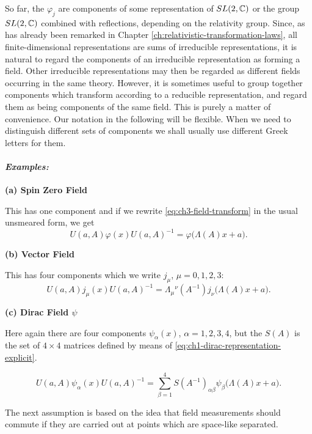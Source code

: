 So far, the $\varphi_j$ are components of some representation of
$SL(2,\mathbb{C})$ or the group $SL(2,\mathbb{C})$ combined with reflections, depending on
the relativity group. Since, as has already been remarked in Chapter \ref{ch:relativistic-transformation-laws}, all
finite-dimensional representations are sums of irreducible representations,
it is natural to regard the components of an irreducible representation as
forming a field. Other irreducible representations may then be regarded as
different fields occurring in the same theory. However, it is sometimes
useful to group together components which transform according to a reducible
representation, and regard them as being components of the same field. This
is purely a matter of convenience. Our notation in the following will be
flexible. When we need to distinguish different sets of components we shall
usually use different Greek letters for them.

\paragraph{\emph{Examples:}}

\noindent\textbf{(a) Spin Zero Field}

This has one component and if we rewrite \eqref{eq:ch3-field-transform} in the usual unsmeared form,
we get
\begin{equation*}
  U(a,A)\varphi(x)U(a,A)^{-1}
  =\varphi\bigl(\Lambda(A)x+a\bigr).
\end{equation*}

\noindent\textbf{(b) Vector Field}

This has four components which we write $j_\mu$, $\mu=0,1,2,3$:
\begin{equation*}
  U(a,A)j_\mu(x)U(a,A)^{-1}
  =\Lambda_\mu{}^\nu(A^{-1})j_\nu\bigl(\Lambda(A)x+a\bigr).
\end{equation*}

\noindent\textbf{(c) Dirac Field $\psi$}

Here again there are four components $\psi_\alpha(x)$, $\alpha=1,2,3,4$,
but the $S(A)$ is the set of $4\times4$ matrices defined by means of
\eqref{eq:ch1-dirac-representation-explicit}.

\begin{equation*}
  U(a,A)\psi_\alpha(x)U(a,A)^{-1}
  =\sum_{\beta=1}^{4}S(A^{-1})_{\alpha\beta}
   \psi_\beta\bigl(\Lambda(A)x+a\bigr).
\end{equation*}

The next assumption is based on the idea that field measurements should
commute if they are carried out at points which are space-like separated.

